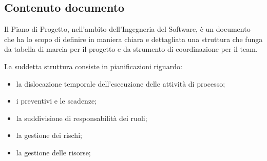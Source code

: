 \documentclass[10pt, letterpaper]{article}
\begin{document}
\subsection{Contenuto documento}
Il Piano di Progetto, nell'ambito dell'Ingegneria del Software, è un documento che ha lo scopo di definire in maniera chiara e dettagliata una struttura che funga
da tabella di marcia per il progetto e da strumento di coordinazione per il team.

La suddetta struttura consiste in pianificazioni riguardo:
\begin{itemize}
    \item la dislocazione temporale dell'esecuzione delle attività di processo;
    \item i preventivi e le scadenze;
    \item la suddivisione di responsabilità dei ruoli;
    \item la gestione dei rischi;
    \item la gestione delle risorse;
\end{itemize}
\end{document}

